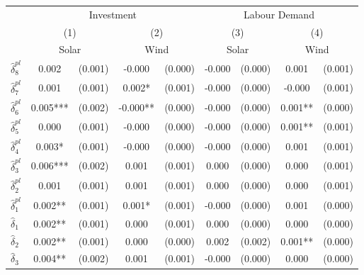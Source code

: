 {
\def\sym#1{\ifmmode^{#1}\else\(^{#1}\)\fi}
\begin{tabular}{l*{4}{cc}}
\toprule
            &\multicolumn{4}{c}{Investment}                           &\multicolumn{4}{c}{Labour Demand}                        \\\cmidrule(lr){2-5}\cmidrule(lr){6-9}
            &\multicolumn{2}{c}{(1)}     &\multicolumn{2}{c}{(2)}     &\multicolumn{2}{c}{(3)}     &\multicolumn{2}{c}{(4)}     \\
            &\multicolumn{2}{c}{Solar}   &\multicolumn{2}{c}{Wind}    &\multicolumn{2}{c}{Solar}   &\multicolumn{2}{c}{Wind}    \\
\midrule
$\hat{\delta}_8^{pl}$&       0.002   &     (0.001)&      -0.000   &     (0.000)&      -0.000   &     (0.000)&       0.001   &     (0.001)\\
$\hat{\delta}_7^{pl}$&       0.001   &     (0.001)&       0.002*  &     (0.001)&      -0.000   &     (0.000)&      -0.000   &     (0.001)\\
$\hat{\delta}_6^{pl}$&       0.005***&     (0.002)&      -0.000** &     (0.000)&      -0.000   &     (0.000)&       0.001** &     (0.000)\\
$\hat{\delta}_5^{pl}$&       0.000   &     (0.001)&      -0.000   &     (0.000)&      -0.000   &     (0.000)&       0.001** &     (0.001)\\
$\hat{\delta}_4^{pl}$&       0.003*  &     (0.001)&      -0.000   &     (0.000)&      -0.000   &     (0.000)&       0.001   &     (0.001)\\
$\hat{\delta}_3^{pl}$&       0.006***&     (0.002)&       0.001   &     (0.001)&       0.000   &     (0.000)&       0.000   &     (0.001)\\
$\hat{\delta}_2^{pl}$&       0.001   &     (0.001)&       0.001   &     (0.001)&       0.000   &     (0.000)&       0.000   &     (0.001)\\
$\hat{\delta}_1^{pl}$&       0.002** &     (0.001)&       0.001*  &     (0.001)&      -0.000   &     (0.000)&       0.001   &     (0.000)\\
$\hat{\delta}_1$&       0.002** &     (0.001)&       0.000   &     (0.001)&       0.000   &     (0.000)&       0.000   &     (0.000)\\
$\hat{\delta}_2$&       0.002** &     (0.001)&       0.000   &     (0.000)&       0.002   &     (0.002)&       0.001** &     (0.000)\\
$\hat{\delta}_3$&       0.004** &     (0.002)&       0.001   &     (0.001)&      -0.000   &     (0.000)&       0.000   &     (0.000)\\

\end{tabular}}
